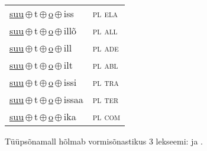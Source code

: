\begin{minipage}{\textwidth}
\begin{sideways}
\begin{tabular}{l l}
\underline{suu}\,$\oplus$\,t\,$\oplus$\,\underline{o}\,$\oplus$\,iss & \textsc{ pl ela } \\
\underline{suu}\,$\oplus$\,t\,$\oplus$\,\underline{o}\,$\oplus$\,illõ & \textsc{ pl all } \\
\underline{suu}\,$\oplus$\,t\,$\oplus$\,\underline{o}\,$\oplus$\,ill & \textsc{ pl ade } \\
\underline{suu}\,$\oplus$\,t\,$\oplus$\,\underline{o}\,$\oplus$\,ilt & \textsc{ pl abl } \\
\underline{suu}\,$\oplus$\,t\,$\oplus$\,\underline{o}\,$\oplus$\,issi & \textsc{ pl tra } \\
\underline{suu}\,$\oplus$\,t\,$\oplus$\,\underline{o}\,$\oplus$\,issaa & \textsc{ pl ter } \\
\underline{suu}\,$\oplus$\,t\,$\oplus$\,\underline{o}\,$\oplus$\,ika & \textsc{ pl com } \\
\end{tabular}
\end{sideways}
\label{tab:tüüpsõnamall-suuto}

\end{minipage}

 
\vspace{1em}
\noindent Tüüpsõnamall  hõlmab vormisõnastikus 3 lekseemi:  ja .
